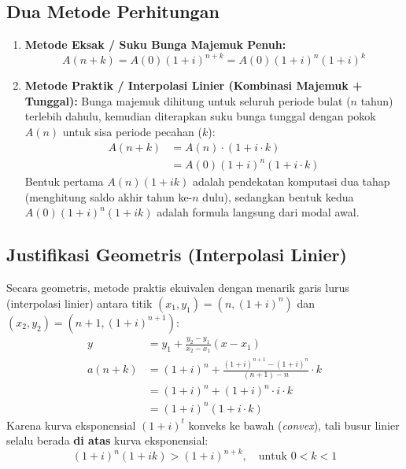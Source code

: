\documentclass[11pt,a4paper]{article}
\begin{document}
\subsection{Dua Metode Perhitungan}
\begin{enumerate}[leftmargin=1.5em]
    \item \textbf{Metode Eksak / Suku Bunga Majemuk Penuh:}
    \begin{equation}
        A(n+k) = A(0)(1+i)^{n+k} = A(0)(1+i)^n(1+i)^k
    \end{equation}
    
    \item \textbf{Metode Praktik / Interpolasi Linier (Kombinasi Majemuk + Tunggal):}
    Bunga majemuk dihitung untuk seluruh periode bulat ($n$ tahun) terlebih dahulu, kemudian diterapkan suku bunga tunggal dengan pokok $A(n)$ untuk sisa periode pecahan ($k$):
    \begin{align}
        A(n+k) &= A(n) \cdot (1 + i \cdot k) \nonumber\\[0.3em]
               &= A(0)(1+i)^n(1 + i \cdot k)
    \end{align}
    Bentuk pertama $A(n)(1 + ik)$ adalah pendekatan komputasi dua tahap (menghitung saldo akhir tahun ke-$n$ dulu), sedangkan bentuk kedua $A(0)(1+i)^n(1+ik)$ adalah formula langsung dari modal awal.
\end{enumerate}

\subsection{Justifikasi Geometris (Interpolasi Linier)}
Secara geometris, metode praktis ekuivalen dengan menarik garis lurus (interpolasi linier) antara titik $(x_1, y_1) = (n, (1+i)^n)$ dan $(x_2, y_2) = (n+1, (1+i)^{n+1})$:
\begin{align*}
    y &= y_1 + \frac{y_2 - y_1}{x_2 - x_1}(x - x_1) \\[0.5em]
    a(n+k) &= (1+i)^n + \frac{(1+i)^{n+1} - (1+i)^n}{(n+1) - n} \cdot k \\[0.5em]
    &= (1+i)^n + (1+i)^n \cdot i \cdot k \\[0.5em]
    &= (1+i)^n (1 + i \cdot k)
\end{align*}
Karena kurva eksponensial $(1+i)^t$ konveks ke bawah (\textit{convex}), tali busur linier selalu berada \textbf{di atas} kurva eksponensial:
\begin{equation*}
    (1+i)^n (1 + ik) > (1+i)^{n+k}, \quad \text{untuk } 0 < k < 1
\end{equation*}
\end{document}
